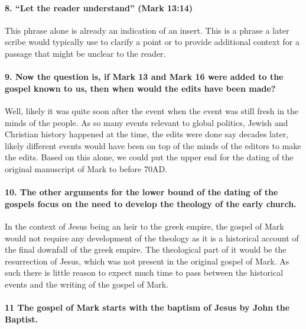 \paragraph{8.
``Let the reader understand'' (Mark 13:14)}\label{par:let-the-reader-understand-mark-1314}

This phrase alone is already an indication of an insert.
This is a phrase a later scribe would typically use to clarify a point or to provide additional context for a passage that might be unclear to the reader.

\paragraph{9.
Now the question is, if Mark 13 and Mark 16 were added to the gospel known to us, then when would the edits have been made?}\label{par:now-the-question-is-if-mark-13-and-mark-16-were-added-to-the-gospel-known-to-us-then-when-would-the-edits-have-been-made}

Well, likely it was quite soon after the event when the event was still fresh in the minds of the people.
As so many events relevant to global politics, Jewish and Christian history happened at the time, the edits were done say decades later, likely different events would have been on top of the minds of the editors to make the edits.
Based on this alone, we could put the upper end for the dating of the original manuscript of Mark to before 70AD.

\paragraph{10.
The other arguments for the lower bound of the dating of the gospels focus on the need to develop the theology of the early church.}\label{par:the-other-arguments-for-the-lower-bound-of-the-dating-of-the-gospels-focus-on-the-need-to-develop-the-theology-of-the-early-church.}

In the context of Jesus being an heir to the greek empire, the gospel of Mark would not require any development of the theology as it is a historical account of the final downfall of the greek empire.
The theological part of it would be the resurrection of Jesus, which was not present in the original gospel of Mark.
As such there is little reason to expect much time to pass between the historical events and the writing of the gospel of Mark.

\paragraph{11 The gospel of Mark starts with the baptism of Jesus by John the Baptist.}\label{par:the-gospel-of-mark-starts-with-the-baptism-of-jesus-by-john-the-baptist.}


